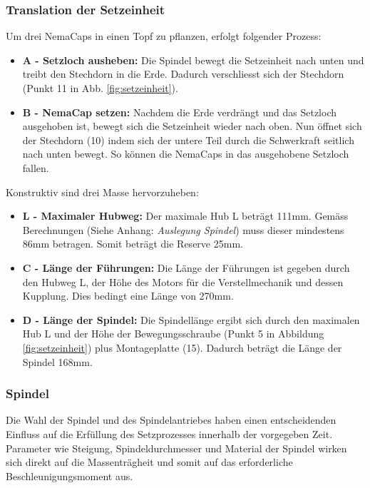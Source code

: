  
\subsubsection{Translation der Setzeinheit}
Um drei NemaCaps in einen Topf zu pflanzen, erfolgt folgender Prozess:
\begin{itemize}
	\item \textbf{A - Setzloch ausheben:} Die Spindel bewegt die Setzeinheit nach unten und treibt den Stechdorn in die Erde. Dadurch verschliesst sich der Stechdorn (Punkt 11 in Abb. \ref{fig:setzeinheit}). 

	\item \textbf{B - NemaCap setzen:} Nachdem die Erde verdrängt und das Setzloch ausgehoben ist, bewegt sich die Setzeinheit wieder nach oben. Nun öffnet sich der Stechdorn (10) indem sich der untere Teil durch die Schwerkraft seitlich nach unten bewegt. So können die NemaCaps in das ausgehobene Setzloch fallen.
\end{itemize}

Konstruktiv sind drei Masse hervorzuheben:
\begin{itemize}
	\item \textbf{L - Maximaler Hubweg:} Der maximale Hub L beträgt 111mm. Gemäss Berechnungen (Siehe Anhang: \textit{Auslegung Spindel}) muss dieser mindestens 86mm betragen. Somit beträgt die Reserve 25mm. 
	
	\item \textbf{C - Länge der Führungen:} Die Länge der Führungen ist gegeben durch den Hubweg L, der Höhe des Motors für die Verstellmechanik  und dessen Kupplung. Dies bedingt eine Länge von 270mm.
	
	\item \textbf{D - Länge der Spindel:} Die Spindellänge ergibt sich durch den maximalen Hub L und der Höhe der Bewegungsschraube (Punkt 5 in Abbildung \ref{fig:setzeinheit}) plus Montageplatte (15). Dadurch beträgt die Länge der Spindel 168mm.
\end{itemize}

\subsubsection{Spindel}
Die Wahl der Spindel und des Spindelantriebes haben einen entscheidenden Einfluss auf die Erfüllung des Setzprozesses innerhalb der vorgegeben Zeit. Parameter wie Steigung, Spindeldurchmesser und Material der Spindel wirken sich direkt auf die Massenträgheit und somit auf das erforderliche Beschleunigungsmoment aus.
\newline

